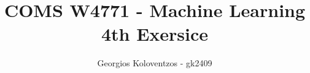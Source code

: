 \documentclass[letterpaper,single,9pt]{article}
\begin{document}
\title{COMS W4771 - Machine Learning 4th Exersice}

  \author{ {\rm Georgios Koloventzos - gk2409} \\ }

\maketitle

%



\end{document}
